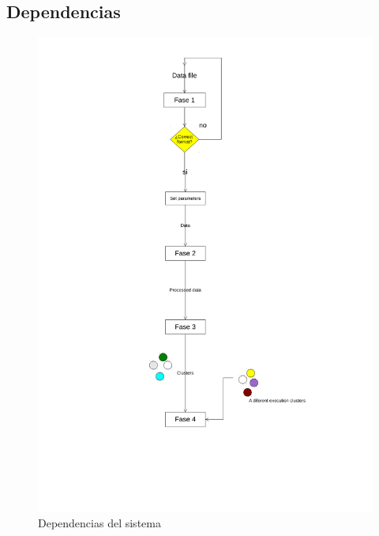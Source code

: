 \documentclass[10pt,a4paper]{article}
\begin{document}
\subsection*{Dependencias}
\begin{figure}[h!]
	\centering
	\includegraphics[scale=0.50]{./img/dependenciasKmeans.pdf}%
	\caption[Esquema de dependencias del sistema]{Dependencias del sistema}
	\label{fig:dependencias}
\end{figure}


\end{document}
